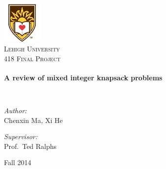 \begin{titlepage}
\begin{center}


\includegraphics[width=0.15\textwidth]{lehigh.jpg}~\\[1cm]

\textsc{\LARGE Lehigh University}\\[1.5cm]

\textsc{\Large 418 Final Project}\\[0.5cm]

\HRule \\[0.4cm]
{ \Large \bfseries A review of mixed integer knapsack problems\\[0.4cm] }

\HRule \\[1.5cm]

\noindent
\begin{minipage}{0.4\textwidth}
\begin{flushleft} \large
\emph{Author:}\\
Chenxin Ma, Xi He
\end{flushleft}
\end{minipage}%
\begin{minipage}{0.4\textwidth}
\begin{flushright} \large
\emph{Supervisor:} \\
Prof.~Ted Ralphs
\end{flushright}
\end{minipage}

\vfill

{\Large Fall 2014}

\end{center}
\end{titlepage}